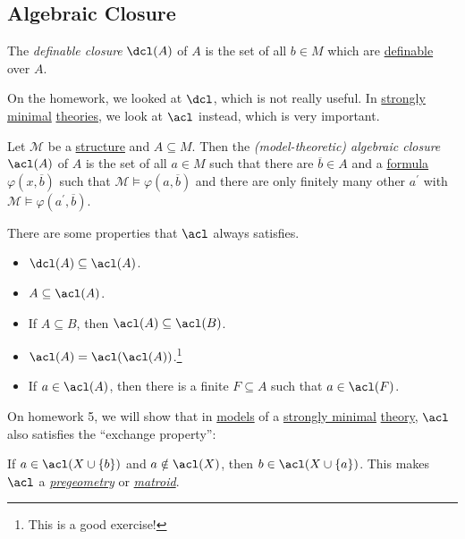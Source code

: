 \subsection{Algebraic Closure}
\begin{prev}
	The \emph{definable closure} \(\dcl(A) \) of \(A\) is the set of all \(b\in M\) which are \hyperref[def:definable]{definable} over \(A\).
\end{prev}

On the homework, we looked at \(\dcl\), which is not really useful. In \hyperref[def:strongly-minimal]{strongly minimal} \hyperref[def:theory]{theories}, we look at \(\acl \) instead, which is very important.

\begin{definition}\label{def:model-algebraic-closure}
	Let \(\mathcal{M} \) be a \hyperref[def:structure]{structure} and \(A \subseteq M\). Then the \emph{(model-theoretic) algebraic closure} \(\acl(A) \) of \(A\) is the set of all \(a\in M\) such that there are \(\overline{b} \in A\) and a \hyperref[def:formula]{formula} \(\varphi (x, \overline{b} )\) such that \(\mathcal{M} \models \varphi (a, \overline{b} )\) and there are only finitely many other \(a^{\prime} \) with \(\mathcal{M} \models \varphi (a^{\prime} , \overline{b} )\).
\end{definition}

\begin{note}
	There are some properties that \(\acl \) always satisfies.
	\begin{itemize}
		\item \(\dcl(A) \subseteq \acl(A) \).
		\item \(A \subseteq \acl(A) \).
		\item If \(A \subseteq B\), then \(\acl(A) \subseteq \acl(B) \).
		\item \(\acl(A) = \acl(\acl(A)) \).\footnote{This is a good exercise!}
		\item If \(a\in \acl(A) \), then there is a finite \(F \subseteq A\) such that \(a\in \acl(F) \).
	\end{itemize}
\end{note}

On homework 5, we will show that in \hyperref[def:model]{models} of a \hyperref[def:strongly-minimal]{strongly minimal} \hyperref[def:theory]{theory}, \(\acl\) also satisfies the ``exchange property'':

\begin{remark}
	If \(a\in \acl(X \cup \left\{ b \right\}) \) and \(a \notin \acl(X) \), then \(b\in \acl(X \cup \left\{ a \right\}) \). This makes \(\acl \) a \href{https://en.wikipedia.org/wiki/Pregeometry_(model_theory)}{\emph{pregeometry}} or \href{https://en.wikipedia.org/wiki/Matroid}{\emph{matroid}}.
\end{remark}

